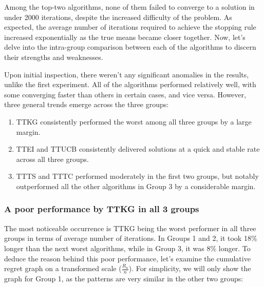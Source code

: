 \documentclass[a4paper, 12pt]{article}
\theoremstyle{definition}
\begin{document}
Among the top-two algorithms, none of them failed to converge to a solution in under 2000 iterations, despite the increased difficulty of the problem. As expected, the average number of iterations required to achieve the stopping rule increased exponentially as the true means became closer together. Now, let's delve into the intra-group comparison between each of the algorithms to discern their strengths and weaknesses.

Upon initial inspection, there weren't any significant anomalies in the results, unlike the first experiment. All of the algorithms performed relatively well, with some converging faster than others in certain cases, and vice versa. However, three general trends emerge across the three groups:

\begin{enumerate}
\item TTKG consistently performed the worst among all three groups by a large margin.
\item TTEI and TTUCB consistently delivered solutions at a quick and stable rate across all three groups.
\item TTTS and TTTC performed moderately in the first two groups, but notably outperformed all the other algorithms in Group 3 by a considerable margin.
\end{enumerate}

\subsubsection{A poor performance by TTKG in all 3 groups}
The most noticeable occurrence is TTKG being the worst performer in all three groups in terms of average number of iterations. In Groups 1 and 2, it took 18\% longer than the next worst algorithms, while in Group 3, it was 8\% longer. To deduce the reason behind this poor performance, let's examine the cumulative regret graph on a transformed scale ($\frac{R_n}{n}$). For simplicity, we will only show the graph for Group 1, as the patterns are very similar in the other two groups:
\end{document}
